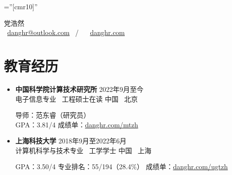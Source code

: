 \documentclass[a4paper,10pt]{ctexart} %
\begin{document}
\pagestyle{empty} %

\font\fb=''[cmr10]'' %



\begin{center}
    {\LARGE 党浩然} \\
     \  \href{mailto:danghr@outlook.com}{danghr@outlook.com} \  / \   \  \href{https://www.danghr.com}{danghr.com} \\
\end{center}



\section{教育经历}

    \begin{itemize}
        \item \textbf{中国科学院计算技术研究所} \hfill 2022年9月至今\\
        电子信息专业 \, 工程硕士在读 \hfill 中国 \, 北京 \\
        \begin{small}
            导师：范东睿（研究员） \\
            GPA：3.81/4 \quad
            成绩单：\href{https://www.danghr.com/mtzh}{danghr.com/mtzh}
        \end{small}
        \item \textbf{上海科技大学} \hfill 2018年9月至2022年6月\\
        计算机科学与技术专业 \, 工学学士        \hfill 中国 \, 上海 \\
        \begin{small}
            GPA：3.50/4 \quad 专业排名：55/194（28.4\%） \quad
            成绩单：\href{https://www.danghr.com/ugtzh}{danghr.com/ugtzh}
        \end{small}
    \end{itemize}


\end{document}
